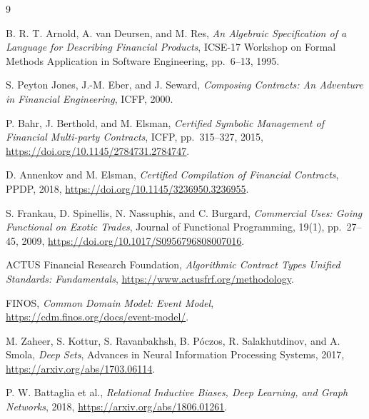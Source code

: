 \documentclass{strategynet-journal}
\begin{document}
\begin{thebibliography}{9}

B. R. T. Arnold, A. van Deursen, and M. Res,
\emph{An Algebraic Specification of a Language for Describing Financial
Products},
ICSE-17 Workshop on Formal Methods Application in Software Engineering,
pp.~6--13, 1995.

S. Peyton Jones, J.-M. Eber, and J. Seward,
\emph{Composing Contracts: An Adventure in Financial Engineering},
ICFP, 2000.

P. Bahr, J. Berthold, and M. Elsman,
\emph{Certified Symbolic Management of Financial Multi-party Contracts},
ICFP, pp.~315--327, 2015,
\url{https://doi.org/10.1145/2784731.2784747}.

D. Annenkov and M. Elsman,
\emph{Certified Compilation of Financial Contracts},
PPDP, 2018,
\url{https://doi.org/10.1145/3236950.3236955}.

S. Frankau, D. Spinellis, N. Nassuphis, and C. Burgard,
\emph{Commercial Uses: Going Functional on Exotic Trades},
Journal of Functional Programming, 19(1), pp.~27--45, 2009,
\url{https://doi.org/10.1017/S0956796808007016}.

ACTUS Financial Research Foundation,
\emph{Algorithmic Contract Types Unified Standards: Fundamentals},
\url{https://www.actusfrf.org/methodology}.

FINOS,
\emph{Common Domain Model: Event Model},
\url{https://cdm.finos.org/docs/event-model/}.

M. Zaheer, S. Kottur, S. Ravanbakhsh, B. Póczos, R. Salakhutdinov, and
A. Smola,
\emph{Deep Sets},
Advances in Neural Information Processing Systems, 2017,
\url{https://arxiv.org/abs/1703.06114}.

P. W. Battaglia et al.,
\emph{Relational Inductive Biases, Deep Learning, and Graph Networks},
2018,
\url{https://arxiv.org/abs/1806.01261}.

\end{thebibliography}
\end{document}
